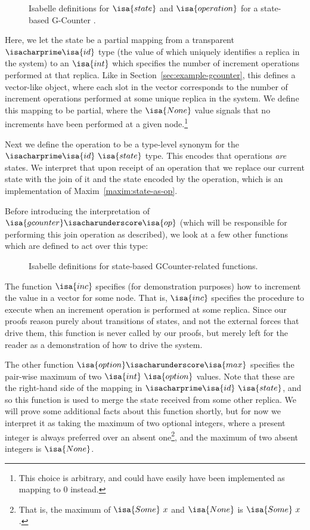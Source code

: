 \begin{figure}[H]
  
  \caption{Isabelle definitions for $\isa{state}$ and $\isa{operation}$ for a
    state-based G-Counter \CRDT.}
\end{figure}

Here, we let the state be a partial mapping from a transparent
$\isacharprime\isa{id}$ type (the value of which uniquely identifies a replica
in the system) to an $\isa{int}$ which specifies the number of increment
operations performed at that replica. Like in
Section~\ref{sec:example-gcounter}, this defines a vector-like object, where
each slot in the vector corresponds to the number of increment operations
performed at some unique replica in the system. We define this mapping to be
partial, where the $\isa{None}$ value signals that no increments have been
performed at a given node.\footnote{This choice is arbitrary, and could have
easily have been implemented as mapping to $0$ instead.}

Next we define the operation to be a type-level synonym for the
$\isacharprime\isa{id}~\isa{state}$ type. This encodes that operations
\emph{are} states. We interpret that upon receipt of an operation that we
replace our current state with the join of it and the state encoded by the
operation, which is an implementation of Maxim~\ref{maxim:state-as-op}.

Before introducing the interpretation of
$\isa{gcounter}\isacharunderscore\isa{op}$ (which will be responsible for
performing this join operation as described), we look at a few other functions
which are defined to act over this type:

\begin{figure}[H]
  
  \caption{Isabelle definitions for state-based GCounter-related functions.}
\end{figure}

The function $\isa{inc}$ specifies (for demonstration purposes) how to increment
the value in a vector for some node. That is, $\isa{inc}$ specifies the
procedure to execute when an increment operation is performed at some replica.
Since our proofs reason purely about transitions of states, and not the external
forces that drive them, this function is never called by our proofs, but merely
left for the reader as a demonstration of how to drive the system.

The other function $\isa{option}\isacharunderscore\isa{max}$ specifies the
pair-wise maximum of two $\isa{int}~\isa{option}$ values. Note that these are
the right-hand side of the mapping in $\isacharprime\isa{id}~\isa{state}$, and
so this function is used to merge the state received from some other replica.
We will prove some additional facts about this function shortly, but for now we
interpret it as taking the maximum of two optional integers, where a present
integer is always preferred over an absent one\footnote{That is, the maximum of
$\isa{Some}~x$ and $\isa{None}$ is $\isa{Some}~x$.}, and the maximum of two
absent integers is $\isa{None}$.

